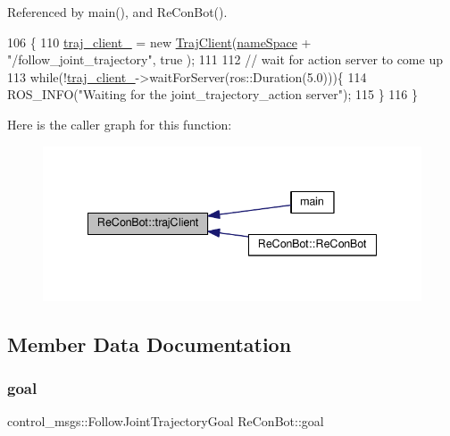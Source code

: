 Referenced by main(), and Re\+Con\+Bot().


\begin{DoxyCode}
106                          \{
110   \hyperlink{class_re_con_bot_a14a35ad6ca284af7db7228d7872720d1}{traj\_client\_} = \textcolor{keyword}{new} \hyperlink{_re_con_bot_8h_a6fb8875093261cdc69e54d3ac7d5c301}{TrajClient}(\hyperlink{class_re_con_bot_a40ca07cd606988b78664c4a52fd8dc59}{nameSpace} + \textcolor{stringliteral}{"/follow\_joint\_trajectory"}, \textcolor{keyword}{true}
      );
111 
112   \textcolor{comment}{// wait for action server to come up}
113   \textcolor{keywordflow}{while}(!\hyperlink{class_re_con_bot_a14a35ad6ca284af7db7228d7872720d1}{traj\_client\_}->waitForServer(ros::Duration(5.0)))\{
114   ROS\_INFO(\textcolor{stringliteral}{"Waiting for the joint\_trajectory\_action server"});
115   \}
116 \}
\end{DoxyCode}
Here is the caller graph for this function\+:
\nopagebreak
\begin{figure}[H]
\begin{center}
\leavevmode
\includegraphics[width=338pt]{d9/d0b/class_re_con_bot_ab859fa96532995d3c1545aaa9db1802e_icgraph}
\end{center}
\end{figure}


\subsection{Member Data Documentation}
\mbox{\label{class_re_con_bot_a9bd1c7ddf2376e2e68ea5d8bd8c3f505}} 
\subsubsection{\texorpdfstring{goal}{goal}}
{\footnotesize\ttfamily control\+\_\+msgs\+::\+Follow\+Joint\+Trajectory\+Goal Re\+Con\+Bot\+::goal\hspace{0.3cm}{\ttfamily [protected]}}



